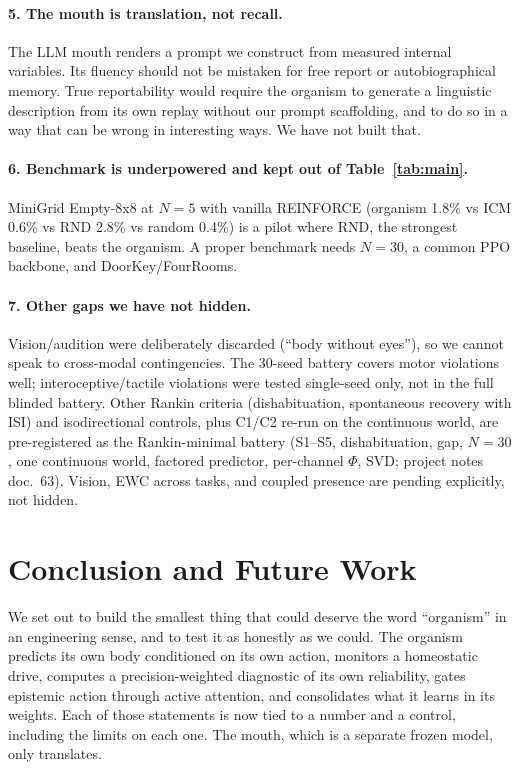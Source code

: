 \documentclass[11pt,a4paper]{article}
\begin{document}
\paragraph{5. The mouth is translation, not recall.} The LLM mouth renders a prompt we construct from measured internal variables. Its fluency should not be mistaken for free report or autobiographical memory. True reportability would require the organism to generate a linguistic description from its own replay without our prompt scaffolding, and to do so in a way that can be wrong in interesting ways. We have not built that.

\paragraph{6. Benchmark is underpowered and kept out of Table~\ref{tab:main}.} MiniGrid Empty-8x8 at $N=5$ with vanilla REINFORCE (organism 1.8\% vs ICM 0.6\% vs RND 2.8\% vs random 0.4\%) is a pilot where RND, the strongest baseline, beats the organism. A proper benchmark needs $N=30$, a common PPO backbone, and DoorKey/FourRooms.

\paragraph{7. Other gaps we have not hidden.} Vision/audition were deliberately discarded (``body without eyes''), so we cannot speak to cross-modal contingencies. The 30-seed battery covers motor violations well; interoceptive/tactile violations were tested single-seed only, not in the full blinded battery. Other Rankin criteria (dishabituation, spontaneous recovery with ISI) and isodirectional controls, plus C1/C2 re-run on the continuous world, are pre-registered as the Rankin-minimal battery (S1--S5, dishabituation, gap, $N=30$, one continuous world, factored predictor, per-channel $\Phi$, SVD; project notes doc.~63). Vision, EWC across tasks, and coupled presence are pending explicitly, not hidden.

\section{Conclusion and Future Work}

We set out to build the smallest thing that could deserve the word ``organism'' in an engineering sense, and to test it as honestly as we could. The organism predicts its own body conditioned on its own action, monitors a homeostatic drive, computes a precision-weighted diagnostic of its own reliability, gates epistemic action through active attention, and consolidates what it learns in its weights. Each of those statements is now tied to a number and a control, including the limits on each one. The mouth, which is a separate frozen model, only translates.
\end{document}
